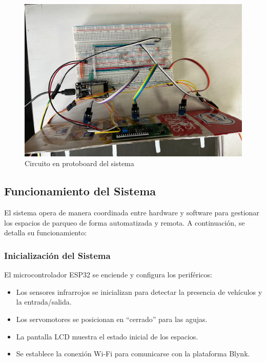 \documentclass[12pt,a4paper]{article}
\begin{document}
\begin{figure}[H]
    \centering
    \includegraphics[width=0.8\linewidth]{Imagenes/circuito.jpeg}
    \caption{Circuito en protoboard del sistema}
    \label{fig:105}
\end{figure}

\subsection{Funcionamiento del Sistema}
El sistema opera de manera coordinada entre hardware y software para gestionar los espacios de parqueo de forma automatizada y remota. A continuación, se detalla su funcionamiento:

\subsubsection{Inicialización del Sistema}
El microcontrolador ESP32 se enciende y configura los periféricos:
    \begin{itemize}
        \item Los sensores infrarrojos se inicializan para detectar la presencia de vehículos y la entrada/salida.
        \item Los servomotores se posicionan en ``cerrado'' para las agujas.
        \item La pantalla LCD muestra el estado inicial de los espacios.
        \item Se establece la conexión Wi-Fi para comunicarse con la plataforma Blynk.
    \end{itemize}
\end{document}

